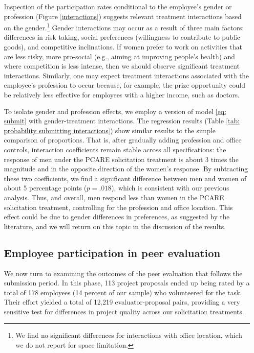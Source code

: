\documentclass[11pt, titlepage]{article}
\begin{document}
Inspection of the participation rates conditional to the employee's
gender or profession (Figure \ref{interactions}) suggests relevant
treatment interactions based on the gender.\footnote{We find no
  significant differences for interactions with office location, which
  we do not report for space limitation.} Gender interactions may occur
as a result of three main factors: differences in risk taking, social
preferences (willingness to contribute to public goods), and competitive
inclinations. If women prefer to work on activities that are less risky,
more pro-social (e.g., aiming at improving people's health) and where
competition is less intense, then we should observe significant
treatment interactions. Similarly, one may expect treatment interactions
associated with the employee's profession to occur because, for example,
the prize opportunity could be relatively less effective for employees
with a higher income, such as doctors.



To isolate gender and profession effects, we employ a version of model
\eqref{eq: submit} with gender-treatment interactions. The regression
results (Table \ref{tab: probability submitting interactions}) show
similar results to the simple comparison of proportions. That is, after
gradually adding profession and office controls, interaction
coefficients remain stable across all specifications: the response of
men under the PCARE solicitation treatment is about 3 times the
magnitude and in the opposite direction of the women's response. By
subtracting these two coefficients, we find a significant difference
between men and women of about 5 percentage points (\(p=.018\)), which
is consistent with our previous analysis. Thus, and overall, men respond
less than women in the PCARE solicitation treatment, controlling for the
profession and office location. This effect could be due to gender
differences in preferences, as suggested by the literature, and we will
return on this topic in the discussion of the results.

\subsection{Employee participation in peer
evaluation}\label{employee-participation-in-peer-evaluation}

We now turn to examining the outcomes of the peer evaluation that
follows the submission period. In this phase, 113 project proposals
ended up being rated by a total of 178 employees (14 percent of our
sample) who volunteered for the task. Their effort yielded a total of
12,219 evaluator-proposal pairs, providing a very sensitive test for
differences in project quality across our solicitation treatments.
\end{document}
